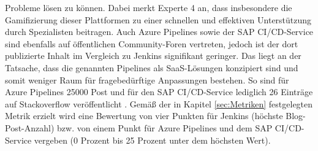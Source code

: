 Probleme lösen zu können. Dabei merkt Experte 4 an, dass insbesondere die Gamifizierung dieser Plattformen zu einer schnellen und effektiven Unterstützung durch Spezialisten beitragen. Auch Azure Pipelines sowie der SAP CI/CD-Service sind ebenfalls auf öffentlichen Community-Foren vertreten, jedoch ist der dort publizierte Inhalt im Vergleich zu Jenkins signifikant geringer. Das liegt an der Tatsache, dass die genannten Pipelines als SaaS-Lösungen konzipiert sind und somit weniger Raum für fragebedürftige Anpassungen bestehen. So sind für Azure Pipelines 25000 Post und für den SAP CI/CD-Service lediglich 26 Einträge auf Stackoverflow veröffentlicht \cite{StackOverflow.20230403b}\cite{StackOverflow.20230403c}. Gemäß der in Kapitel \ref{sec:Metriken} festgelegten Metrik erzielt wird eine Bewertung von vier Punkten für Jenkins (höchste Blog-Post-Anzahl) bzw. von einem Punkt für Azure Pipelines und dem SAP CI/CD-Service vergeben (0 Prozent bis 25 Prozent unter dem höchsten Wert).\\
